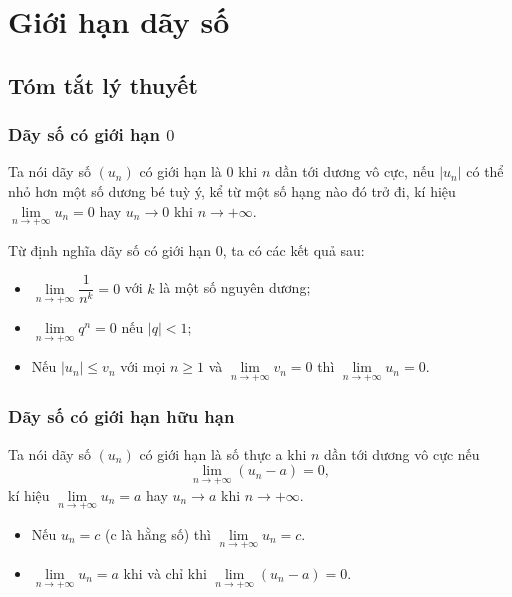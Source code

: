 \section{Giới hạn dãy số}
\subsection{Tóm tắt lý thuyết}
\subsubsection{Dãy số có giới hạn $0$}
	\begin{dn}
		Ta nói dãy số $\left(u_{n}\right)$ có giới hạn là $0$ khi $n$ dần tới dương vô cực, nếu $\left|u_{n}\right|$ có thể nhỏ hơn một số dương bé tuỳ ý, kể từ một số hạng nào đó trở đi, kí hiệu $\lim \limits_{n \rightarrow+\infty} u_{n}=0$ hay $u_{n} \rightarrow 0$ khi $n \rightarrow+\infty$.
	\end{dn}
	Từ định nghĩa dãy số có giới hạn $0$, ta có các kết quả sau:
	\begin{itemize}
		\item $\lim \limits_{n \rightarrow+\infty} \dfrac{1}{n^{k}}=0$ với $k$ là một số nguyên dương;	
		\item $\lim \limits_{n \rightarrow+\infty} q^{n}=0$ nếu $|q|<1$;	
		\item Nếu $\left|u_{n}\right| \leq v_{n}$ với mọi $n \geq 1$ và $\lim \limits_{n \rightarrow+\infty} v_{n}=0$ thì $\lim \limits_{n \rightarrow+\infty} u_{n}=0$.	
	\end{itemize}
	\subsubsection{Dãy số có giới hạn hữu hạn}
	\begin{dn}
		Ta nói dãy số $\left(u_{n}\right)$ có giới hạn là số thực a khi $n$ dần tới dương vô cực nếu $$\lim \limits_{n \rightarrow+\infty}\left(u_{n}-a\right)=0,$$ kí hiệu $\lim \limits_{n \rightarrow+\infty} u_{n}=a$ hay $u_{n} \rightarrow a$ khi $n \rightarrow+\infty$. 
	\end{dn}
	\begin{itemize}
		\item Nếu $u_{n}=c$ (c là hằng số) thì $\lim \limits_{n \rightarrow+\infty} u_{n}=c$. 
		\item $\lim \limits_{n \rightarrow+\infty} u_{n}=a$ khi và chỉ khi $\lim \limits_{n \rightarrow+\infty}\left(u_{n}-a\right)=0$.
	\end{itemize}
